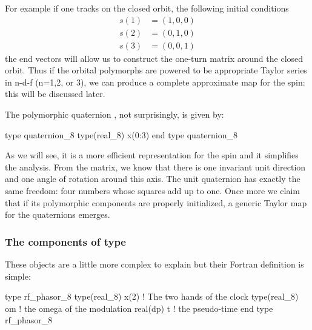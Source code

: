 \documentclass[english,12pt,article]{article} %
\begin{document}
For example if one tracks on the closed orbit, the following initial conditions
%
\begin{align} s(1)&=\left({1,0,0}\right)\nonumber \\
 s(2)&=\left({0,1,0}\right)\nonumber \\
 s(3)&=\left({0,0,1}\right)\end{align}
the end vectors will allow us to construct  the one-turn matrix around the closed orbit. Thus if the orbital polymorphs are powered to be appropriate Taylor series in n-d-f (n=1,2, or 3), we can produce a complete approximate map for the spin: this will be discussed later.


The polymorphic  quaternion , not surprisingly, is given by:
 
  \begin{example}
 type  quaternion_8 
  type(real_8) x(0:3)
end type quaternion_8
  \end{example}
   
   As we will see, it is a more efficient representation for the spin and it simplifies the analysis. From the matrix, we know that there is one invariant unit direction and one angle of rotation around this axis. The unit quaternion has exactly the same freedom: four numbers whose squares add up to one. Once more we claim that if its polymorphic components are properly initialized, a generic Taylor map for the quaternions emerges.
   
  \subsubsection{The   components of type   }\label{sec:codemod}
  
  These objects are a little more complex to explain but their Fortran definition is simple:
  
     \begin{example}
  type rf_phasor_8
     type(real_8)  x(2)  ! The two hands of the clock
     type(real_8) om     ! the omega of the modulation
     real(dp) t          ! the pseudo-time
  end type rf_phasor_8
    \end{example}
    
\end{document}
